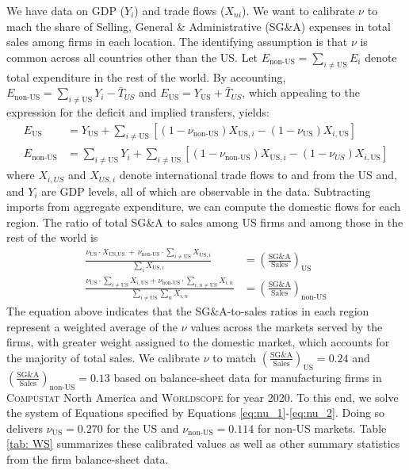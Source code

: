 \documentclass[12pt]{article}
\begin{document}
We have data on GDP ($Y_{i}$) and trade flows ($X_{ni}$). We want
to calibrate $\nu$ to mach the share of Selling, General \& Administrative
(SG\&A) expenses in total sales among firms in each location. The
identifying assumption is that $\nu$ is common across all countries
other than the US. Let $E_{\text{non-US}}=\sum_{i\neq\text{US}} E_{i}$ denote total expenditure in the rest of the world. By accounting, $E_{\text{non-US}}=\sum_{i\neq\text{US}}Y_{i} - \bar{T}_{US}$ and $E_{\text{US}}=Y_{\text{US}} + \bar{T}_{US}$, which appealing to the expression for the deficit and implied transfers, yields:
\begin{align} 
\label{eq:nu_1} E_{\text{US}}&=Y_{\text{US}}+\sum_{i\neq\text{US}}\left[(1-\nu_{\text{non-US}})X_{\text{US},i}-(1-\nu_{\text{US}})X_{i,\text{US}}\right]\\E_{\text{non-US}}&=\sum_{i\neq\text{US}}Y_{i}+\sum_{i\neq\text{US}}\left[(1-\nu_{\text{non-US}})X_{\text{US},i}-(1-\nu_{US})X_{i,\text{US}}\right]
\end{align}
where $X_{i,US}$ and $X_{US,i}$ denote international trade flows to and from the US and, and $Y_{i}$ are GDP levels, all of which are observable in the data. Subtracting imports from aggregate expenditure, we can compute the domestic flows for each region. The ratio of total SG\&A to sales among US firms and among those in the rest of the world is
\begin{align}
\frac{\nu_{\text{US}}\cdot X_{\text{US},\text{US}}\ +\,\nu_{\text{non-US}}\cdot\sum_{i\neq\text{US}}X_{\text{US},i}}{\sum_{i}X_{\text{US},i}} & =\left(\frac{\text{SG\&A}}{\text{Sales}}\right)_{\text{US}}\\
\frac{\nu_{\text{US}}\cdot\sum_{i\neq\text{US}}X_{i,\text{US}}+\nu_{\text{non-US}}\cdot\sum_{i,n\neq\text{US}}X_{i,n}}{\sum_{i\neq\text{US}}\sum_{n}X_{i,n}} & =\left(\frac{\text{SG\&A}}{\text{Sales}}\right)_{\text{non-US} \label{eq:nu_2}} 
\end{align}
The equation above indicates that the SG\&A-to-sales ratios in each region represent a weighted average of the $\nu$ values across the markets served by the firms, with greater weight assigned to the domestic market, which accounts for the majority of total sales. We calibrate $\nu$ to match $\left(\frac{\text{SG\&A}}{\text{Sales}}\right)_{\text{US}}=0.24$
and $\left(\frac{\text{SG\&A}}{\text{Sales}}\right)_{\text{non-US}}=0.13$ based
on balance-sheet data for manufacturing firms in \textsc{Compustat} North America
and \textsc{Worldscope} for year 2020. To this end, we solve the system of Equations specified by Equations \ref{eq:nu_1}-\ref{eq:nu_2}. Doing so delivers $\nu_{\text{US}}=0.270$ for the US and $\nu_{\text{non-US}}=0.114$ for non-US markets. Table \ref{tab: WS} summarizes these calibrated values as well as other summary statistics from the firm balance-sheet data.
\end{document}

